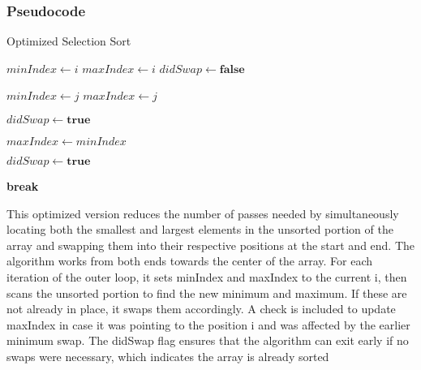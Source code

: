 \subsubsection{Pseudocode}
\begin{algorithm} [H]
    \caption{Optimized Selection Sort}
    \begin{algorithmic}
            \State{} $minIndex \gets i$
            \State{} $maxIndex \gets i$
            \State{} $didSwap \gets \textbf{false}$
            
                    \State{} $minIndex \gets j$
                \EndIf{}
                    \State{} $maxIndex \gets j$
                \EndIf{}
            \EndFor{}
    
                \State{} 
                \State{} $didSwap \gets \textbf{true}$
            \EndIf{}
    
                \State{} $maxIndex \gets minIndex$
            \EndIf{}
    
                \State{} 
                \State{} $didSwap \gets \textbf{true}$
            \EndIf{}
    
                \State{} \textbf{break}
            \EndIf{}
        \EndFor{}
    \EndProcedure{}
    \end{algorithmic}
    \end{algorithm}
    
    
This optimized version reduces the number of passes needed by simultaneously locating both the smallest and largest elements in the unsorted portion of the array and swapping them into their respective positions at the start and end. The algorithm works from both ends towards the center of the array. For each iteration of the outer loop, it sets minIndex and maxIndex to the current i, then scans the unsorted portion to find the new minimum and maximum. If these are not already in place, it swaps them accordingly. A check is included to update maxIndex in case it was pointing to the position i and was affected by the earlier minimum swap. The didSwap flag ensures that the algorithm can exit early if no swaps were necessary, which indicates the array is already sorted